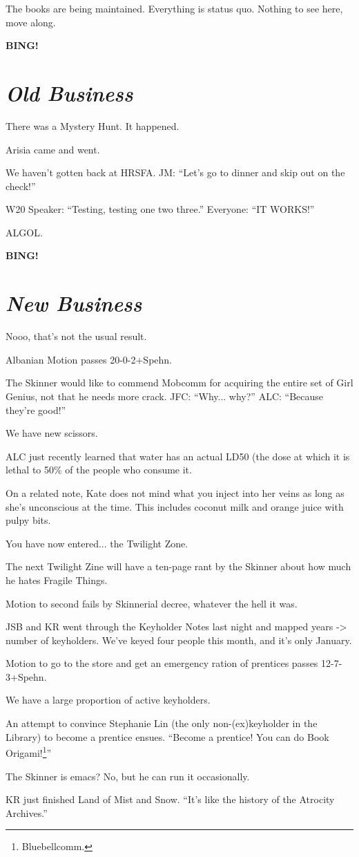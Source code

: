 \documentclass[10pt]{article}
\newcommand{\bing}{{\bf BING!} }
\newcommand{\goto}[1]{\bing \vskip 12pt \section*{{\em{#1}}}}
\begin{document}
The books are being maintained.  Everything is status quo.  Nothing to see here, move along.

\goto{Old Business}

There was a Mystery Hunt.  It happened.

Arisia came and went.

We haven't gotten back at HRSFA.  JM: ``Let's go to dinner and skip out on the check!''

W20 Speaker: ``Testing, testing one two three.''  Everyone: ``IT WORKS!''

ALGOL.

\goto{New Business}

Nooo, that's not the usual result.

Albanian Motion passes 20-0-2+Spehn.

The Skinner would like to commend Mobcomm for acquiring the entire set of Girl Genius, not that he needs more crack.  JFC: ``Why... why?''  ALC: ``Because they're good!''

We have new scissors.

ALC just recently learned that water has an actual LD50 (the dose at which it is lethal to 50\% of the people who consume it.

On a related note, Kate does not mind what you inject into her veins as long as she's unconscious at the time.  This includes coconut milk and orange juice with pulpy bits.

You have now entered... the Twilight Zone.

The next Twilight Zine will have a ten-page rant by the Skinner about how much he hates Fragile Things.

Motion to second fails by Skinnerial decree, whatever the hell it was.

JSB and KR went through the Keyholder Notes last night and mapped years -> number of keyholders.  We've keyed four people this month, and it's only January.

Motion to go to the store and get an emergency ration of prentices passes 12-7-3+Spehn.

We have a large proportion of active keyholders.

An attempt to convince Stephanie Lin (the only non-(ex)keyholder in the Library) to become a prentice ensues.  ``Become a prentice!  You can do Book Origami!\footnote{Bluebellcomm.}''

The Skinner is emacs?  No, but he can run it occasionally.

KR just finished Land of Mist and Snow.  ``It's like the history of the Atrocity Archives.''
\end{document}
